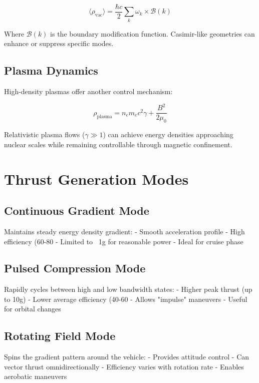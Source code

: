 \documentclass[12pt,letterpaper]{book}
\theoremstyle{definition}
\theoremstyle{plain}
\theoremstyle{remark}
\begin{document}
{{{{{\begin{equation}
\langle \rho_{\text{vac}} \rangle = \frac{\hbar c}{2} \sum_k \omega_k \times \mathcal{B}(k)
\end{equation}

Where $\mathcal{B}(k)$ is the boundary modification function. Casimir-like geometries can enhance or suppress specific modes.

\subsection{Plasma Dynamics}

High-density plasmas offer another control mechanism:

\begin{equation}
\rho_{\text{plasma}} = n_e m_e c^2 \gamma + \frac{B^2}{2\mu_0}
\end{equation}

Relativistic plasma flows ($\gamma \gg 1$) can achieve energy densities approaching nuclear scales while remaining controllable through magnetic confinement.

\section{Thrust Generation Modes}

\subsection{Continuous Gradient Mode}

Maintains steady energy density gradient:
- Smooth acceleration profile
- High efficiency (60-80%
- Limited to ~1g for reasonable power
- Ideal for cruise phase

\subsection{Pulsed Compression Mode}

Rapidly cycles between high and low bandwidth states:
- Higher peak thrust (up to 10g)
- Lower average efficiency (40-60%
- Allows "impulse" maneuvers
- Useful for orbital changes

\subsection{Rotating Field Mode}

Spins the gradient pattern around the vehicle:
- Provides attitude control
- Can vector thrust omnidirectionally
- Efficiency varies with rotation rate
- Enables aerobatic maneuvers

}}}}}
\end{document}
